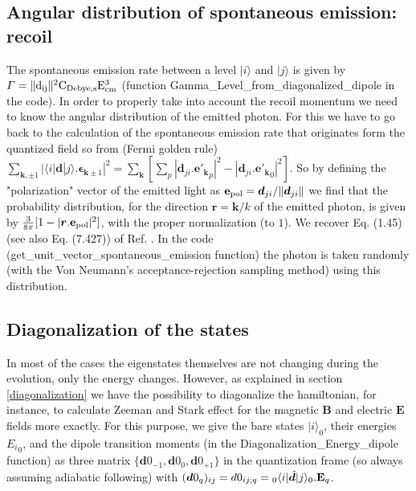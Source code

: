 \documentclass[amsmath,amssymb,nofootinbib]{revtex4-2}
\begin{document}
	 	 \subsection{Angular distribution of spontaneous emission: recoil}
	 	 
	 	 
	 	 The spontaneous emission rate  between a level $| i \rangle $ and $|j\rangle$ is given by 
	  $\Gamma =\|\rm d_{ij}\|^2 C_{{\rm Debye},s} E_{\rm cm}^3$ (function  Gamma\_Level\_from\_diagonalized\_dipole in the code). In order to properly take into account the recoil momentum we need to know the angular distribution of the emitted photon.
	 	 For this we have to go back to the calculation of the spontaneous emission rate that originates form the quantized field 
	 so from (Fermi golden rule)
	 	 $\sum_{\bm k,\pm 1} | \langle i | \bm d | j \rangle. {\bm \epsilon}_{\bm k \pm 1}|^2 =  \sum_{\bm k} \left[ \sum_p | \bm d_{ji} . {{\bm e'}_{\bm k}}_p |^2 - |  \bm d_{ji} . {{\bm e'}_{\bm k}}_0 |^2  \right] $. So by defining the
	 	 "polarization" vector of the emitted light as ${\bf{e}}_{\rm pol} = \bm d_{ji} /\|\bm d_{ji} \|$ we find  that the probability distribution, for
	 	 	the direction $\bm r = \bm k/k$ of the emitted photon, is 
 given by
	 	 $ \frac{3}{8\pi} [1-|\bm r.{\bf{e}}_{\rm pol}|^2]$, with the proper normalization (to $1$). 
	 	 We recover Eq. (1.45) (see also Eq. (7.427)) of Ref.	 \cite{manual_Steck}. In the code (get\_unit\_vector\_spontaneous\_emission function) the photon is  taken randomly (with the Von Neumann's acceptance-rejection sampling method) using this distribution. %
	 	
	 		 \subsection{Diagonalization of the states} 
	 		 
	 		
	 		In most of the cases the eigenstates themselves are not changing  during the evolution, only the energy changes. However, 
	 		as explained in section \ref{diagonalization}
	 		we have the possibility
	 		 to diagonalize the hamiltonian, for instance, to calculate Zeeman and Stark effect for the magnetic $\bm B$ and electric $\bm E$ fields more exactly. For this purpose,
	 		 we  give the bare states $|i\rangle_0$, their energies ${E_i}_0$, and the dipole transition moments
	 		 (in the Diagonalization\_Energy\_dipole function)  as three matrix $\{ \bm d0_{-1},\bm d0_{0},\bm d0_{+1} \} $   in the quantization frame (so always assuming adiabatic following)  with  $ 
	 		 (\bm d0_{q})_{ij} =
	 		 d0_{ij;q} =   {}_0\langle i | \hat {\bm d} | j \rangle_0 . {\bf{E}}_q $.
	 		 
\end{document}
